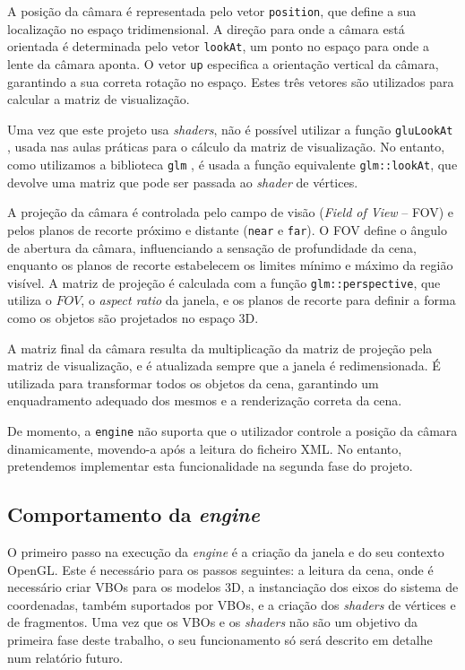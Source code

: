 \documentclass[12pt, a4paper]{article}
\begin{document}
A posição da câmara é representada pelo vetor \texttt{position}, que define a sua localização no
espaço tridimensional. A direção para onde a câmara está orientada é determinada pelo vetor
\texttt{lookAt}, um ponto no espaço para onde a lente da câmara aponta. O vetor \texttt{up}
especifica a orientação vertical da câmara, garantindo a sua correta rotação no espaço. Estes três
vetores são utilizados para calcular a matriz de visualização.

Uma vez que este projeto usa \emph{shaders}, não é possível utilizar a função \texttt{gluLookAt}
\cite{gluLookAt}, usada nas aulas práticas para o cálculo da matriz de visualização. No entanto,
como utilizamos a biblioteca \texttt{glm} \cite{glm}, é usada a função equivalente
\texttt{glm::lookAt}, que devolve uma matriz que pode ser passada ao \emph{shader} de vértices.

A projeção da câmara é controlada pelo campo de visão (\emph{Field of View} -- FOV) e pelos planos
de recorte próximo e distante (\texttt{near} e \texttt{far}). O FOV define o ângulo de abertura da
câmara, influenciando a sensação de profundidade da cena, enquanto os planos de recorte estabelecem
os limites mínimo e máximo da região visível. A matriz de projeção é calculada com a função
\texttt{glm::perspective}, que utiliza o $FOV$, o \emph{aspect ratio} da janela, e os planos de
recorte para definir a forma como os objetos são projetados no espaço 3D.

A matriz final da câmara resulta da multiplicação da matriz de projeção pela matriz de visualização,
e é atualizada sempre que a janela é redimensionada. É utilizada para transformar todos os objetos
da cena, garantindo um enquadramento adequado dos mesmos e a renderização correta da cena.

De momento, a \texttt{engine} não suporta que o utilizador controle a posição da câmara
dinamicamente, movendo-a após a leitura do ficheiro XML. No entanto, pretendemos implementar esta
funcionalidade na segunda fase do projeto.

\subsection{Comportamento da \emph{engine}}

O primeiro passo na execução da \emph{engine} é a criação da janela e do seu contexto OpenGL. Este é
necessário para os passos seguintes: a leitura da cena, onde é necessário criar VBOs para os
modelos 3D, a instanciação dos eixos do sistema de coordenadas, também suportados por VBOs, e a
criação dos \emph{shaders} de vértices e de fragmentos. Uma vez que os VBOs e os \emph{shaders} não
são um objetivo da primeira fase deste trabalho, o seu funcionamento só será descrito em detalhe num
relatório futuro.
\end{document}
